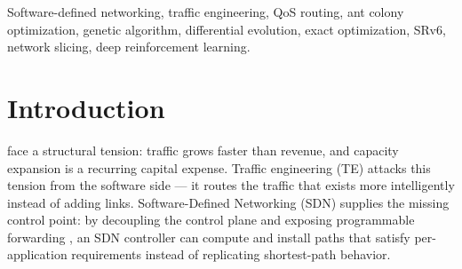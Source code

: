 \documentclass[journal]{IEEEtran}
\begin{document}
\begin{IEEEkeywords}
Software-defined networking, traffic engineering, QoS routing, ant colony
optimization, genetic algorithm, differential evolution, exact optimization,
SRv6, network slicing, deep reinforcement learning.
\end{IEEEkeywords}

\section{Introduction}
 face a structural tension: traffic grows faster
than revenue, and capacity expansion is a recurring capital expense.
Traffic engineering (TE) attacks this tension from the software side --- it
routes the traffic that exists more intelligently instead of adding links.
Software-Defined Networking (SDN) supplies the missing control point: by
decoupling the control plane and exposing programmable forwarding
\cite{mckeown2008,kim2013,hu2014}, an SDN controller can compute and install
paths that satisfy per-application requirements instead of replicating
shortest-path behavior.
\end{document}
